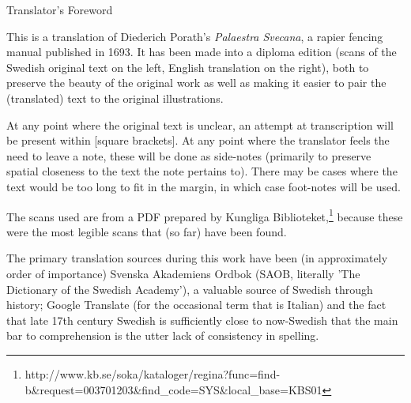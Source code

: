 {\large Translator's Foreword}

This is a translation of Diederich Porath's {\it Palaestra Svecana}, a rapier fencing manual published in 1693. It has been made into a diploma edition (scans of the Swedish original text on the left, English translation on the right), both to preserve the beauty of the original work as well as making it easier to pair the (translated) text to the original illustrations.

At any point where the original text is unclear, an attempt at transcription will be present within [square brackets]. At any point where the translator feels the need to leave a note, these will be done as side-notes (primarily to preserve spatial closeness to the text the note pertains to).  There may be cases where the text would be too long to fit in the margin, in which case foot-notes will be used.

The scans used are from a PDF prepared by Kungliga Biblioteket,\footnote{ http://www.kb.se/soka/kataloger/regina?func=find-b\&request=003701203\&find\_code=SYS\&local\_base=KBS01} because these were the most legible scans that (so far) have been found.

The primary translation sources during this work have been (in approximately order of importance) Svenska Akademiens Ordbok (SAOB, literally 'The Dictionary of the Swedish Academy'), a valuable source of Swedish through history; Google Translate (for the occasional term that is Italian) and the fact that late 17th century Swedish is sufficiently close to now-Swedish that the main bar to comprehension is the utter lack of consistency in spelling.
